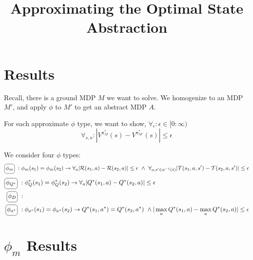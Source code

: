 \documentclass[11pt]{amsart}
\title{Approximating the Optimal State Abstraction}
\author{}
\date{}                                           %
\begin{document}
\maketitle


\section{Results}

Recall, there is a ground MDP $M$ we want to solve. We homogenize to an MDP $M'$, and apply $\phi$ to $M'$ to get an abstract MDP $A$.

For each approximate $\phi$ type, we want to show, $\forall_{\epsilon} : \epsilon \in [0 : \infty)$
\begin{equation}
\forall_{s,a} : | V^{\pi^*_M}(s) - V^{\pi^*_{M'}}(s) | \leq \epsilon
\end{equation}

We consider four $\phi$ types:
\begin{multline*}
\encircle{$\phi_m$}\ : \phi_{m}(s_1) = \phi_m(s_2) \rightarrow \forall_a |\mathcal{R}(s_1,a) - \mathcal{R}(s_2,a)| \leq \epsilon \ \wedge\ 
\forall_{a,s' \in \phi^{-1}(\bar{s})} | \mathcal{T}(s_1,a,s') - \mathcal{T}(s_2,a,s') | \leq \epsilon
\end{multline*}
\begin{align*}
\encircle{$\phi_{Q^*}$}\ & : \phi_Q^*(s_1) = \phi_Q^*(s_2) \rightarrow \forall_a |Q^*(s_1,a) - Q^*(s_2,a)| \leq \epsilon \\
\encircle{$\phi_{D}$}\ & : \\
\encircle{$\phi_{a^*}$}\ & : \phi_{a^*}(s_1) = \phi_{a^*}(s_2) \rightarrow Q^*(s_1,a^*) = Q^*(s_2, a^*)\ \wedge |\max_a Q^*(s_1,a) - \max_a Q^*(s_2,a)| \leq \epsilon  \\
\end{align*}


\newpage
\section{$\phi_{m}$ Results}
\end{document}
